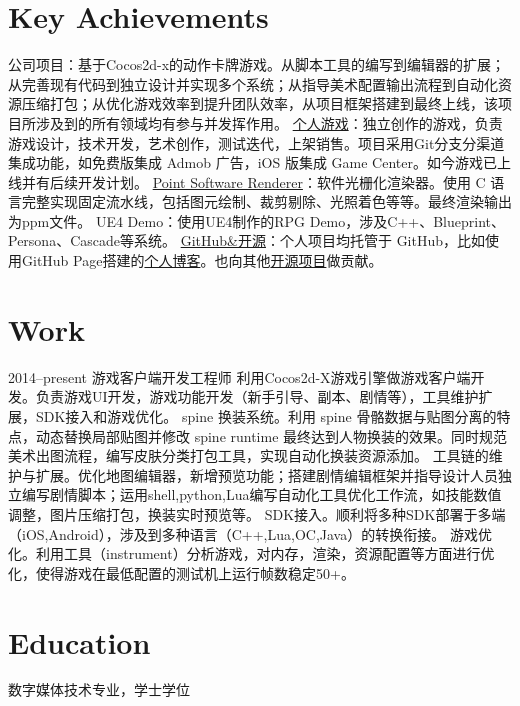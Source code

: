 \documentclass[full]{rvca}
\begin{document}
\section{Key Achievements}

\achievements
{公司项目：基于Cocos2d-x的动作卡牌游戏。从脚本工具的编写到编辑器的扩展；从完善现有代码到独立设计并实现多个系统；从指导美术配置输出流程到自动化资源压缩打包；从优化游戏效率到提升团队效率，从项目框架搭建到最终上线，该项目所涉及到的所有领域均有参与并发挥作用。}
{\href{http://a.app.qq.com/o/simple.jsp?pkgname=com.kode.Thirteen}{个人游戏}：独立创作的游戏，负责游戏设计，技术开发，艺术创作，测试迭代，上架销售。项目采用Git分支分渠道集成功能，如免费版集成 Admob 广告，iOS 版集成 Game Center。如今游戏已上线并有后续开发计划。}
{\href{https://github.com/keyring/point}{Point Software Renderer}：软件光栅化渲染器。使用 C 语言完整实现固定流水线，包括图元绘制、裁剪剔除、光照着色等等。最终渲染输出为ppm文件。}
{UE4 Demo：使用UE4制作的RPG Demo，涉及C++、Blueprint、Persona、Cascade等系统。}
{\href{http://github.com/keyring}{GitHub\&开源}：个人项目均托管于 GitHub，比如使用GitHub Page搭建的\href{http://www.photoneray.com}{个人博客}。也向其他\href{https://github.com/cloudwu/lua53doc/graphs/contributors}{开源项目}做贡献。}
{}

\section{Work}


{2014--present}%
{游戏客户端开发工程师} %
{利用Cocos2d-X游戏引擎做游戏客户端开发。负责游戏UI开发，游戏功能开发（新手引导、副本、剧情等），工具维护扩展，SDK接入和游戏优化。}%
{spine 换装系统。利用 spine 骨骼数据与贴图分离的特点，动态替换局部贴图并修改 spine runtime 最终达到人物换装的效果。同时规范美术出图流程，编写皮肤分类打包工具，实现自动化换装资源添加。}
{工具链的维护与扩展。优化地图编辑器，新增预览功能；搭建剧情编辑框架并指导设计人员独立编写剧情脚本；运用shell,python,Lua编写自动化工具优化工作流，如技能数值调整，图片压缩打包，换装实时预览等。}
{SDK接入。顺利将多种SDK部署于多端（iOS,Android），涉及到多种语言（C++,Lua,OC,Java）的转换衔接。}
{游戏优化。利用工具（instrument）分析游戏，对内存，渲染，资源配置等方面进行优化，使得游戏在最低配置的测试机上运行帧数稳定50+。}
{}

\section{Education}

数字媒体技术专业，学士学位
\end{document}
